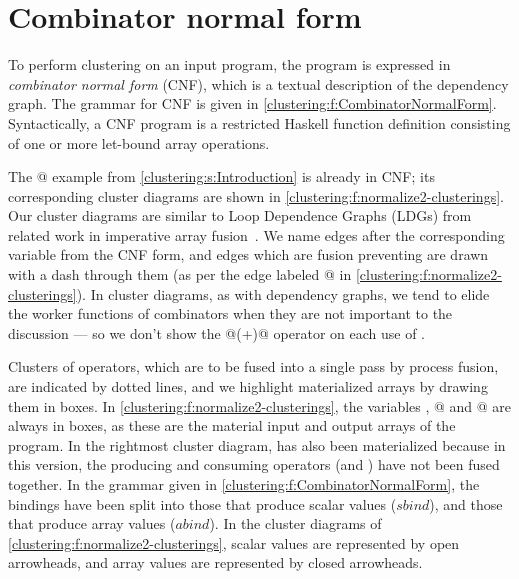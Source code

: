

\section{Combinator normal form}
\label{clustering:s:CombinatorNormalForm}
To perform clustering on an input program, the program is expressed in \emph{combinator normal form} (CNF), which is a textual description of the dependency graph.
The grammar for CNF is given in \cref{clustering:f:CombinatorNormalForm}.
Syntactically, a CNF program is a restricted Haskell function definition consisting of one or more let-bound array operations.



The @ example from \cref{clustering:s:Introduction} is already in CNF;
its corresponding cluster diagrams are shown in \cref{clustering:f:normalize2-clusterings}.
Our cluster diagrams are similar to Loop Dependence Graphs (LDGs) from related work in imperative array fusion~\cite{gao1993collective}.
We name edges after the corresponding variable from the CNF form, and edges which are fusion preventing are drawn with a dash through them (as per the edge labeled @ in \cref{clustering:f:normalize2-clusterings}).
In cluster diagrams, as with dependency graphs, we tend to elide the worker functions of combinators when they are not important to the discussion --- so we don't show the @(+)@ operator on each use of \Hs@fold@.


Clusters of operators, which are to be fused into a single pass by process fusion, are indicated by dotted lines, and we highlight materialized arrays by drawing them in boxes.
In \cref{clustering:f:normalize2-clusterings}, the variables \Hs@xs@, @ and @ are always in boxes, as these are the material input and output arrays of the program.
In the rightmost cluster diagram, \Hs@gts@ has also been materialized because in this version, the producing and consuming operators (\Hs@filter@ and \Hs@fold@) have not been fused together.
In the grammar given in \cref{clustering:f:CombinatorNormalForm}, the bindings have been split into those that produce scalar values ($sbind$), and those that produce array values ($abind$).
In the cluster diagrams of \cref{clustering:f:normalize2-clusterings}, scalar values are represented by open arrowheads, and array values are represented by closed arrowheads.

